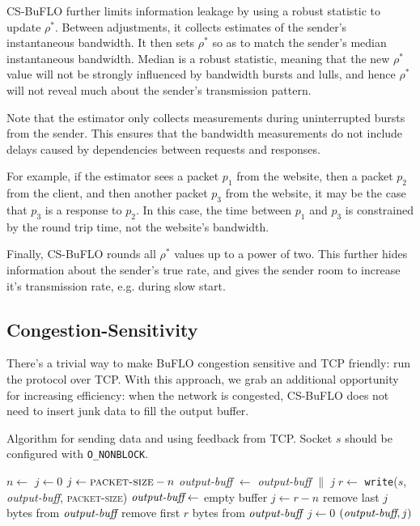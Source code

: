 \documentclass[10pt,journal]{IEEEtran}
\newcommand{\packetsize}{{\sc\textsc{packet-size}}\xspace}
\newcommand{\buflo} {BuFLO\xspace}
\newcommand{\csb} {CS-BuFLO\xspace}
\begin{document}
\csb further limits
information leakage by using a robust statistic to update $\rho^*$.
Between adjustments, it collects estimates of the sender's
instantaneous bandwidth. It then sets $\rho^*$ so as to match the
sender's median instantaneous bandwidth.  Median is a robust
statistic, meaning that the new $\rho^*$ value will not be strongly
influenced by bandwidth bursts and lulls, and hence $\rho^*$ will not
reveal much about the sender's transmission pattern.

Note that the estimator only collects measurements during
uninterrupted bursts from the sender.  This ensures that the bandwidth
measurements do not include delays caused by dependencies between
requests and responses.  

For example, if the estimator sees a packet
$p_1$ from the website, then a packet $p_2$ from the client, and then
another packet $p_3$ from the website, it may be the case that $p_3$ is
a response to $p_2$.  In this case, the time between $p_1$ and $p_3$
is constrained by the round trip time, not the website's bandwidth.

Finally, \csb rounds all $\rho^*$ values up to a power of two.
This further hides information about the sender's true rate, and gives
the sender room to increase it's transmission rate, e.g. during slow
start.

\subsection{Congestion-Sensitivity}
\label{ssec:congestion-sensitivity}

There's a trivial way to make \buflo congestion sensitive and TCP
friendly: run the protocol over TCP. With this approach, we grab an 
additional opportunity for increasing efficiency: when the network is
congested, \csb does not need to insert junk data to fill the output
buffer.


\begin{algorithm}[t]
  \caption{Algorithm for sending data and using feedback from TCP.
    Socket $s$ should be configured with \texttt{O\_NONBLOCK}.}
  \label{alg:cssend}
  \begin{algorithmic}
      \State $n \gets$
      \State $j\gets 0$
      \If{$n<\packetsize$}
        \State $j \gets \packetsize-n$
        \State  \emph{output-buff} $\gets$  \emph{output-buff} $\|$ \emph{j}
      \EndIf
      \State $r \gets$  \texttt{write}($s$, \emph{output-buff}, \packetsize)
       
        \State $\emph{output-buff} \gets $ empty buffer
        \State $j \gets r - n$
      \Else
        \State remove last $j$ bytes from $\emph{output-buff}$
        \State remove first $r$ bytes from $\emph{output-buff}$
        \State $j \gets 0$
      \EndIf
      \State \Return $(\emph{output-buff},j)$
    \EndFunction
  \end{algorithmic}
\end{algorithm}
\end{document}
